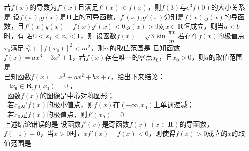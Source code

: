 \documentclass{BHCexam}
\begin{document}
\fubiaoti{}
\maketitle
\begin{questions}
\question
若$f(x)$的导数为$f'(x)$且满足$f'(x)<f(x)$，则$f(3)$与$e^3f(0)$的大小关系是\xx
{}
\question
设$f(x)$,$g(x)$是$\mathbf{R}$上的可导函数，$f'(x)$,$g'(x)$分别是$f(x)$,$g(x)$的导函数，且$f'(x)g(x)-f(x)g'(x)<0$,$g(x)>0$对$x\in\mathbf{R}$恒成立，则当$a<b$时，有\xx
{}
\qs 若$ 0<x_1<x_2<1 $，则\xx
{}
\question
设函数$f(x)=\sqrt{3}\sin\dfrac{\pi x}{m}$.若存在$f(x)$的极值点$x_0$满足$x_0^2+\left[f(x_0)\right]^2<m^2$，则$m$的取值范围是\xx
{}
\question
已知函数$f(x)=ax^3-3x^2+1$，若$f(x)$存在唯一的零点$x_0$，且$x_0>0$，则$a$的取值范围是\\
\mbox{\hspace{2em}}\hfill\xx
{}
\question
已知函数$f(x)=x^3+ax^2+bx+c$，给出下来结论：\\
~$\exists x_0 \in \mathbf{R}$,$f(x_0)=0$；\\
~函数$f(x)$的图像是中心对称图形；\\
~若$x_0$是$f(x)$的极小值点，则$f(x)$在$(-\infty,x_0)$上单调递减；\\
~若$x_0$是$f(x)$的极值点，则$f'(x_0)=0$\\
上述结论错误的是\xx
{}
\question
设函数$f'(x)$是奇函数$f(x)~(x\in \mathbf{R})$的导函数，$f(-1)=0$，当$x>0$时，$xf'(x)-f(x)<0$，则使得$f(x)>0$成立的$x$的取值范围是\xx
{}

\end{questions}
\end{document}

